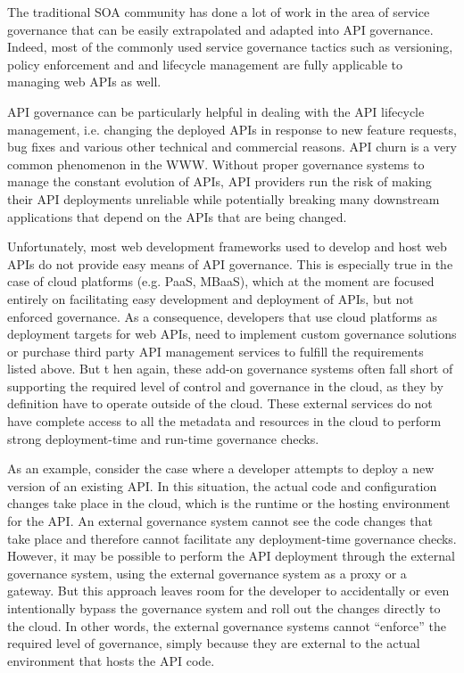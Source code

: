 The traditional SOA community has done a lot of work in the area of service governance that can be easily extrapolated and adapted into
API governance. Indeed, most of the commonly used service governance tactics such as versioning, policy enforcement and and lifecycle
management are fully applicable to managing web APIs as well.

API governance can be particularly helpful in dealing with the API lifecycle management, i.e. changing the deployed APIs in response to new
feature requests, bug fixes and various other technical and commercial reasons. API churn is a very common phenomenon in the WWW. Without
proper governance systems to manage the constant evolution of APIs, API providers run the risk of making their API deployments unreliable
while potentially breaking many downstream applications that depend on the APIs that are being changed.

Unfortunately, most web development frameworks used to develop and host web APIs do not provide easy means of API governance. This is
especially true in the case of cloud platforms (e.g. PaaS, MBaaS), which at the moment are focused entirely on facilitating easy development
and deployment of APIs, but not enforced governance. As a consequence, developers that use cloud platforms as deployment targets for web APIs, 
need to implement custom governance solutions or purchase third party API management services to fulfill the requirements listed above. But t
hen again, these add-on governance
systems often fall short of supporting the required level of control and governance in the cloud, as they by definition have to operate outside of the
cloud. These external services do not have complete access to all the metadata and resources in the cloud to perform strong deployment-time and
run-time governance checks. 

As an example, consider the case where a developer attempts to deploy a new version of an existing API. In this
situation, the actual code and configuration changes take place in the cloud, which is the runtime or the hosting environment for the API. An 
external governance system cannot see the code changes that take place and therefore cannot facilitate any deployment-time governance checks.
However, it may be possible to perform the API deployment through the external governance system, using the external governance system
as a proxy or a gateway. But this approach leaves room for the developer to accidentally
or even intentionally bypass the governance system and roll out the changes directly to the cloud. In other words, the external governance systems
cannot ``enforce'' the required level of governance, simply because they are external to the actual environment that hosts the API code.


